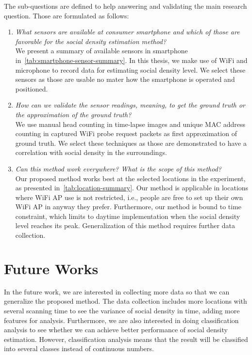 The sub-questions are defined to help answering and validating the main research question. Those are formulated as follows:
\begin{enumerate}
	\item \textit{What sensors are available at consumer smartphone and which of those are favorable for the social density estimation method?}\\
	We present a summary of available sensors in smartphone in~\autoref{tab:smartphone-sensor-summary}. In this thesis, we make use of WiFi and microphone to record data for estimating social density level. We select these sensors as those are usable no mater how the smartphone is operated and positioned.

	\item \textit{How can we validate the sensor readings, meaning, to get the ground truth or the approximation of the ground truth?}\\
	We use manual head counting in time-lapse images and unique \ac{MAC} address counting in captured WiFi probe request packets as first approximation of ground truth. We select these techniques as those are demonstrated to have a correlation with social density in the surroundings.

	

	\item \textit{Can this method work everywhere? What is the scope of this method?}\\
	Our proposed method works best at the selected locations in the experiment, as presented in~\autoref{tab:location-summary}. Our method is applicable in locations where WiFi \ac{AP} use is not restricted, i.e., people are free to set up their own WiFi \ac{AP} in anyway they prefer. Furthermore, our method is bound to time constraint, which limits to daytime implementation when the social density level reaches its peak. Generalization of this method requires further data collection.
\end{enumerate}

\section{Future Works} %
\label{sec:future_works}
In the future work, we are interested in collecting more data so that we can generalize the proposed method. The data collection includes more locations with several scanning time to see the variance of social density in time, adding more features for analysis. Furthermore, we are also interested in doing classification analysis to see whether we can achieve better performance of social density estimation. However, classification analysis means that the result will be classified into several classes instead of continuous numbers.

